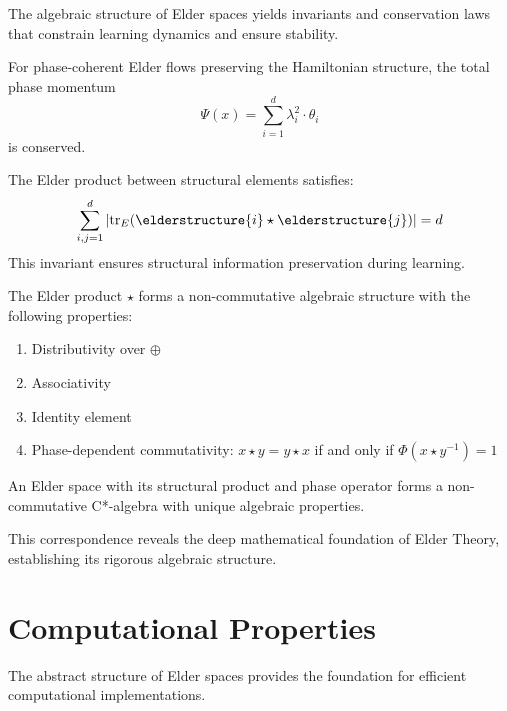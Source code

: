 The algebraic structure of Elder spaces yields invariants and conservation laws that constrain learning dynamics and ensure stability.

\begin{theorem}
For phase-coherent Elder flows preserving the Hamiltonian structure, the total phase momentum
\begin{equation}
\Psi(x) = \sum_{i=1}^{d} \lambda_i^2 \cdot \theta_i
\end{equation}
is conserved.
\end{theorem}

\begin{theorem}
The Elder product between structural elements satisfies:
\begin{equation}
\sum_{i,j=1}^{d} |\mathrm{tr}_E(\elderstructure{i} \star \elderstructure{j})| = d
\end{equation}
This invariant ensures structural information preservation during learning.
\end{theorem}

The Elder product $\star$ forms a non-commutative algebraic structure with the following properties:
\begin{enumerate}
    \item Distributivity over $\oplus$
    \item Associativity
    \item Identity element
    \item Phase-dependent commutativity: $x \star y = y \star x$ if and only if $\Phi(x \star y^{-1}) = 1$
\end{enumerate}

\begin{theorem}
\label{thm:elder-structural}
An Elder space with its structural product and phase operator forms a non-commutative C*-algebra with unique algebraic properties.
\end{theorem}

This correspondence reveals the deep mathematical foundation of Elder Theory, establishing its rigorous algebraic structure.

\section{Computational Properties}

The abstract structure of Elder spaces provides the foundation for efficient computational implementations.

